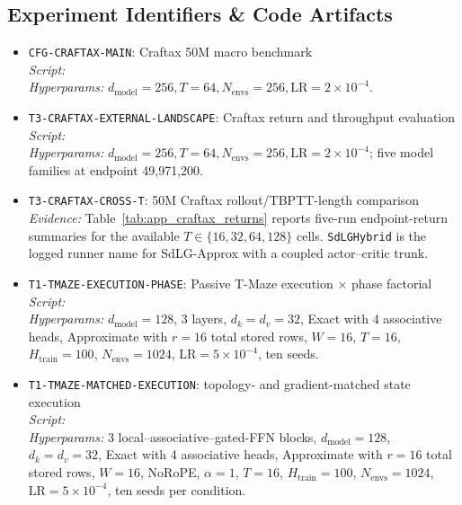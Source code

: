 \subsection{Experiment Identifiers \& Code Artifacts}
\begin{itemize}
    \item \texttt{CFG-CRAFTAX-MAIN}: Craftax 50M macro benchmark \\
    \textit{Script:}  \\
    \textit{Hyperparams:} $d_{\text{model}}=256, T=64, N_{\text{envs}}=256, \text{LR}=2\times 10^{-4}$.

    \item \texttt{T3-CRAFTAX-EXTERNAL-LANDSCAPE}: Craftax return and throughput evaluation \\
    \textit{Script:}  \\
    \textit{Hyperparams:} $d_{\text{model}}=256, T=64, N_{\text{envs}}=256, \text{LR}=2\times 10^{-4}$; five model families at endpoint 49,971,200.

    \item \texttt{T3-CRAFTAX-CROSS-T}: 50M Craftax rollout/TBPTT-length comparison \\
    \textit{Evidence:} Table~\ref{tab:app_craftax_returns} reports five-run endpoint-return summaries for the available $T\in\{16,32,64,128\}$ cells. \texttt{SdLGHybrid} is the logged runner name for SdLG-Approx with a coupled actor--critic trunk.
    
    \item \texttt{T1-TMAZE-EXECUTION-PHASE}: Passive T-Maze execution $\times$ phase factorial \\
    \textit{Script:}  \\
    \textit{Hyperparams:} $d_{\text{model}}=128$, 3 layers, $d_k=d_v=32$, Exact with 4 associative heads, Approximate with $r=16$ total stored rows, $W=16$, $T=16$, $H_{\mathrm{train}}=100$, $N_{\text{envs}}=1024$, $\text{LR}=5\times10^{-4}$, ten seeds.

    \item \texttt{T1-TMAZE-MATCHED-EXECUTION}: topology- and gradient-matched state execution \\
    \textit{Script:}  \\
    \textit{Hyperparams:} 3 local--associative--gated-FFN blocks, $d_{\text{model}}=128$, $d_k=d_v=32$, Exact with 4 associative heads, Approximate with $r=16$ total stored rows, $W=16$, NoRoPE, $\alpha=1$, $T=16$, $H_{\mathrm{train}}=100$, $N_{\text{envs}}=1024$, $\text{LR}=5\times10^{-4}$, ten seeds per condition.
    

\end{itemize}
